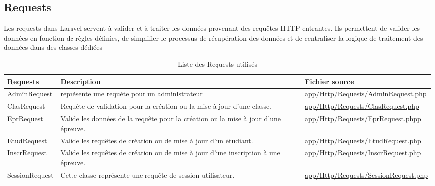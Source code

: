 \subsection{Requests}

Les requests dans Laravel servent à valider et à traiter les données provenant des requêtes HTTP entrantes. Ils permettent de valider les données en fonction de règles définies, de simplifier le processus de récupération des données et de centraliser la logique de traitement des données dans des classes dédiées

\begin{table}[h]
	\begin{adjustbox}{width=\textwidth}
		\begin{tabular}{|l|p{}|p{}|}
			\hline
			\textbf{Requests} & \textbf{Description} & \textbf{Fichier source} \\
			\hline
			AdminRequest & représente une requête pour un administrateur & \url{app/Http/Requests/AdminRequest.php} \\
			ClasRequest 		& Requête de validation pour la création ou la mise à jour d'une classe. 		& \url{app/Http/Requests/ClasRequest.php} \\
			EprRequest 		& Valide les données de la requête pour la création ou la mise à jour d'une épreuve. 		& \url{app/Http/Requests/EprRequest.phpp} \\
			EtudRequest 	& Valide les requêtes de création ou de mise à jour d'un étudiant. 	& \url{app/Http/Requests/EtudRequest.php} \\
			InscrRequest 	& Valide les requêtes de création ou de mise à jour d'une inscription à une épreuve. 	& \url{app/Http/Requests/InscrRequest.php} \\
			SessionRequest 	& Cette classe représente une requête de session utilisateur. 	& \url{app/Http/Requests/SessionRequest.php} \\
			\hline
		\end{tabular}
	\end{adjustbox}
	\caption{Liste des Requests utilisés}
\end{table}